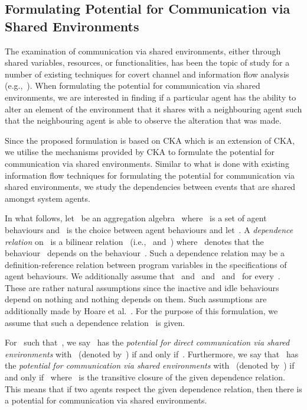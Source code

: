 \documentclass[copyright,creativecommons]{eptcs}
\makeatletter
\newcommand{\eg}{\textrm{e.g.,}\@\xspace}
\newcommand{\ie}{\textrm{i.e.,}\@\xspace}
\newcommand{\etal}{\textrm{et al.}\@\xspace}
\newcommand{\PFC}{potential for communication\@\xspace}
\newcommand{\PFCD}{potential for direct communication\@\xspace}
\newcommand{\CKAabbrv}{CKA\@\xspace}
\newcommand{\CCKAabbrv}{CKA\@\xspace}
\makeatother
\begin{document}
\subsection{Formulating Potential for Communication via Shared Environments}
\label{sub:potential_for_communication_via_shared_environments}


The examination of communication via shared environments, either through shared variables, resources, or functionalities, has been the topic of study for a number of existing techniques for covert channel and information flow analysis (\eg~\cite{Kemmerer1983aa,Kemmerer1991aa,Sabri2009aa,Shieh1999aa,Wang2005aa}). When formulating the \PFC via shared environments, we are interested in finding if a particular agent has the ability to alter an element of the environment that it shares with a neighbouring agent such that the neighbouring agent is able to observe the alteration that was made.

Since the proposed formulation is based on \CCKAabbrv which is an extension of \CKAabbrv, we utilise the mechanisms provided by \CKAabbrv to formulate the \PFC via shared environments. Similar to what is done with existing information flow techniques for formulating the \PFC via shared environments, we study the dependencies between events that are shared amongst system agents.

In what follows, let~ be an aggregation algebra~\cite{Hoare2009ab,Hoare2010aa,Hoare2011aa} where~ is a set of agent behaviours and~ is the choice between agent behaviours and let~. A \emph{dependence relation} on~ is a bilinear relation~ (\ie~ and~) where~ denotes that the behaviour~ depends on the behaviour~. Such a dependence relation may be a definition-reference relation between program variables in the specifications of agent behaviours. We additionally assume that~ and~ and~ and~ for every~. These are rather natural assumptions since the inactive and idle behaviours depend on nothing and nothing depends on them. Such assumptions are additionally made by Hoare \etal~\cite{Hoare2011aa}. For the purpose of this formulation, we assume that such a dependence relation~ is given.

For~ such that~, we say~ has the \emph{\PFCD via shared environments} with~ (denoted by~) if and only if~. Furthermore, we say that~ has the \emph{\PFC via shared environments} with~ (denoted by~) if and only if~ where~ is the transitive closure of the given dependence relation. This means that if two agents respect the given dependence relation, then there is a \PFC via shared environments. 
\end{document}
